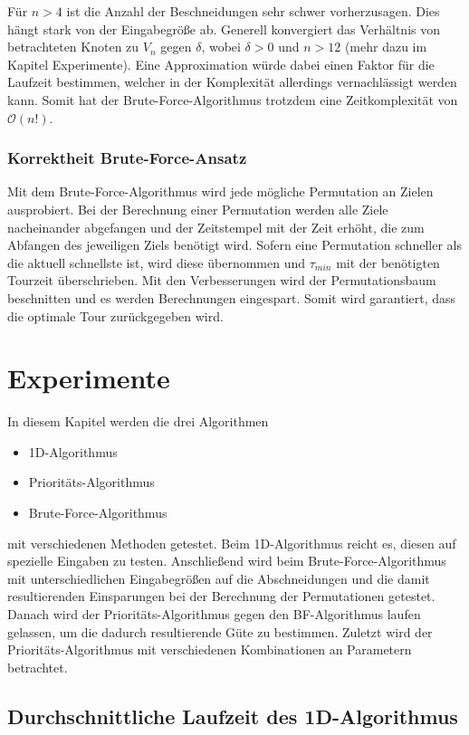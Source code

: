 \documentclass[german,version-2019-11]{uzl-thesis}
\begin{document}
Für $n>4$ ist die Anzahl der Beschneidungen sehr schwer vorherzusagen. Dies hängt stark von der Eingabegröße ab. Generell konvergiert das Verhältnis von betrachteten Knoten zu $V_n$ gegen $\delta$, wobei $\delta>0$ und $n>12$ (mehr dazu im Kapitel Experimente). Eine Approximation würde dabei einen Faktor für die Laufzeit bestimmen, welcher in der Komplexität allerdings vernachlässigt werden kann. Somit hat der Brute-Force-Algorithmus trotzdem eine Zeitkomplexität von $\mathcal{O}(n!)$.

\subsection{Korrektheit Brute-Force-Ansatz}
Mit dem Brute-Force-Algorithmus wird jede mögliche Permutation an Zielen ausprobiert. Bei der Berechnung einer Permutation werden alle Ziele nacheinander abgefangen und der Zeitstempel mit der Zeit erhöht, die zum Abfangen des jeweiligen Ziels benötigt wird. Sofern eine Permutation schneller als die aktuell schnellste ist, wird diese übernommen und $\tau_{min}$ mit der benötigten Tourzeit überschrieben. Mit den Verbesserungen wird der Permutationsbaum beschnitten und es werden Berechnungen eingespart. Somit wird garantiert, dass die optimale Tour zurückgegeben wird.


\chapter{Experimente}
\label{kap5}
In diesem Kapitel werden die drei Algorithmen
\begin{itemize}
\item 1D-Algorithmus
\item Prioritäts-Algorithmus
\item Brute-Force-Algorithmus
\end{itemize}
mit verschiedenen Methoden getestet. Beim 1D-Algorithmus reicht es, diesen auf spezielle Eingaben zu testen. Anschließend wird beim Brute-Force-Algorithmus mit unterschiedlichen Eingabegrößen auf die Abschneidungen und die damit resultierenden Einsparungen bei der Berechnung der Permutationen getestet. Danach wird der Prioritäts-Algorithmus gegen den BF-Algorithmus laufen gelassen, um die dadurch resultierende Güte zu bestimmen. Zuletzt wird der Prioritäts-Algorithmus mit verschiedenen Kombinationen an Parametern betrachtet. 

\section{Durchschnittliche Laufzeit des 1D-Algorithmus}
\end{document}
